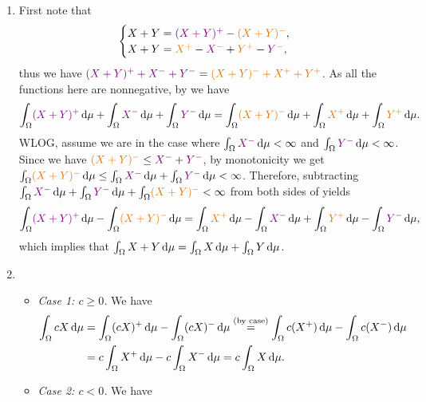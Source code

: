 \begin{enumerate}
\begin{pf}
\begin{enumerate}
\item First note that
\[
\begin{cases}
X+Y=\vc{(X+Y)^{+}}-\orc{(X+Y)^{-}}, \\
X+Y=\orc{X^{+}}-\vc{X^{-}}+\orc{Y^{+}}-\vc{Y^{-}},
\end{cases}
\]
thus we have \(\vc{(X+Y)^{+}+X^{-}+Y^{-}}
=\orc{(X+Y)^{-}+X^{+}+Y^{+}}\). As all the functions here are nonnegative, by
 we have
\begin{equation}
\label{eq:leb-int-sum-eq}
\int_{\Omega}^{}\vc{(X+Y)^{+}}\odif{\mu}
+\int_{\Omega}^{}\vc{X^{-}}\odif{\mu}
+\int_{\Omega}^{}\vc{Y^{-}}\odif{\mu}
=\int_{\Omega}^{}\orc{(X+Y)^{-}}\odif{\mu}
+\int_{\Omega}^{}\orc{X^{+}}\odif{\mu}
+\int_{\Omega}^{}\orc{Y^{+}}\odif{\mu}.
\end{equation}
WLOG, assume we are in the case where \(\int_{\Omega}^{}\vc{X^{-}}\odif{\mu}<\infty\) and
\(\int_{\Omega}^{}\vc{Y^{-}}\odif{\mu}<\infty\). Since we have
\(\orc{(X+Y)^{-}}\le\vc{X^{-}}+\vc{Y^{-}}\), by monotonicity we get
\(\int_{\Omega}^{}\orc{(X+Y)^{-}}\odif{\mu}\le\int_{\Omega}^{}\vc{X^{-}}\odif{\mu}
+\int_{\Omega}^{}\vc{Y^{-}}\odif{\mu}<\infty\). Therefore, subtracting
\(\int_{\Omega}^{}\vc{X^{-}}\odif{\mu}+
\int_{\Omega}^{}\vc{Y^{-}}\odif{\mu}+
\int_{\Omega}^{}\orc{(X+Y)^{-}}<\infty\) from both sides of 
yields
\[
\int_{\Omega}^{}\vc{(X+Y)^{+}}\odif{\mu}
-\int_{\Omega}^{}\orc{(X+Y)^{-}}\odif{\mu}
=\int_{\Omega}^{}\orc{X^{+}}\odif{\mu}
-\int_{\Omega}^{}\vc{X^{-}}\odif{\mu}
+\int_{\Omega}^{}\orc{Y^{+}}\odif{\mu}
-\int_{\Omega}^{}\vc{Y^{-}}\odif{\mu},
\]
which implies that \(\int_{\Omega}^{}X+Y\odif{\mu}
=\int_{\Omega}^{}X\odif{\mu}+\int_{\Omega}^{}Y\odif{\mu}\).
\item 
\begin{itemize}
\item \emph{Case 1: \(c\ge 0\).} We have
\begin{align*}
\int_{\Omega}^{}cX\odif{\mu}
&=\int_{\Omega}^{}(cX)^{+}\odif{\mu}-\int_{\Omega}^{}(cX)^{-}\odif{\mu}
\overset{\text{(by case)}}{=}\int_{\Omega}^{}c(X^{+})\odif{\mu}-\int_{\Omega}^{}c(X^{-})\odif{\mu} \\
&=c\int_{\Omega}^{}X^{+}\odif{\mu}-c\int_{\Omega}^{}X^{-}\odif{\mu}
=c\int_{\Omega}^{}X\odif{\mu}.
\end{align*}
\item \emph{Case 2: \(c<0\).} We have
\begin{align*}

\end{align*}
\end{itemize}
\end{enumerate}
\end{pf}
\end{enumerate}

